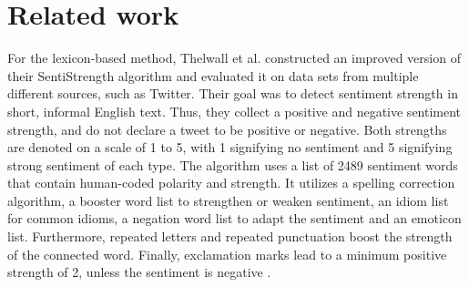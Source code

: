 \chapter{Related work}
\label{cha:Chapter2_RelatedWork}
\iffalse

Length: 1-2 pages

Effort: ~2 weeks

2-3 Arbeiten maximal, die genauer betrachtet werden
Ruhig mehr Zitate --> aber nicht detailliert betrachten
Introduction to Data Mining --> zu generell, nur als Zitat
Hier nur im engsten Sinne


Content
\begin{itemize}
\item Alec Go, Richa Bhayani, and Lei Huang. 2009. Twitter Sentiment Classification Using Distant Supervision.
Technical Report. Standford.
\item Taboada or Serendio or Vader?
\item Khuc et al.
\end{itemize}

\fi


For the lexicon-based method, Thelwall et al. constructed an improved version of their SentiStrength algorithm and evaluated it on data sets from multiple different sources, such as Twitter. Their goal was to detect sentiment strength in short, informal English text. Thus, they collect a positive and negative sentiment strength, and do not declare a tweet to be positive or negative. Both strengths are denoted on a scale of 1 to 5, with 1 signifying no sentiment and 5 signifying strong sentiment of each type. The algorithm uses a list of 2489 sentiment words that contain human-coded polarity and strength. It utilizes a spelling correction algorithm, a booster word list to strengthen or weaken sentiment, an idiom list for common idioms, a negation word list to adapt the sentiment and an emoticon list. Furthermore, repeated letters and repeated punctuation boost the strength of the connected word. Finally, exclamation marks lead to a minimum positive strength of 2, unless the sentiment is negative \cite{10.1002/asi.21662}.


